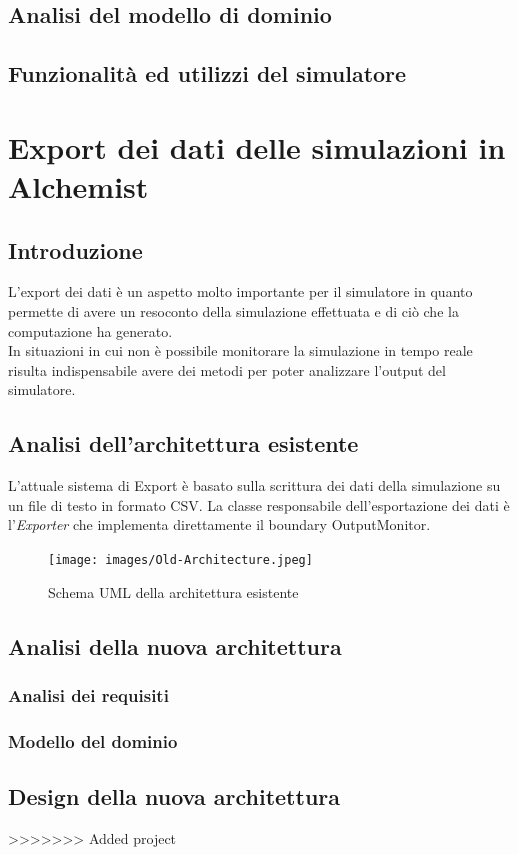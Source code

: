 \documentclass[12pt,a4paper,openright,oneside]{book}
\begin{document}
\section{Analisi del modello di dominio}
\section{Funzionalità ed utilizzi del simulatore}

\newpage
\chapter{Export dei dati delle simulazioni in Alchemist}
\section{Introduzione}
L'export dei dati è un aspetto molto importante per il simulatore in quanto permette di avere un resoconto della simulazione effettuata e di ciò che la computazione ha generato.\\
In situazioni in cui non è possibile monitorare la simulazione in tempo reale risulta indispensabile avere dei metodi per poter analizzare l'output del simulatore.

\section{Analisi dell'architettura esistente}

L'attuale sistema di Export è basato sulla scrittura dei dati della simulazione su un file di testo in formato CSV.
La classe responsabile dell'esportazione dei dati è l'\textit{Exporter} che implementa direttamente il boundary OutputMonitor.

\begin{figure}[H]
    \centering
    \texttt{[image: images/Old-Architecture.jpeg]}
    \caption{Schema UML della architettura esistente}
    \label{fig:UML_old_arch}
\end{figure}


\section{Analisi della nuova architettura}
\subsection{Analisi dei requisiti}
\subsection{Modello del dominio}

\section{Design della nuova architettura}


>>>>>>> Added project
\end{document}
